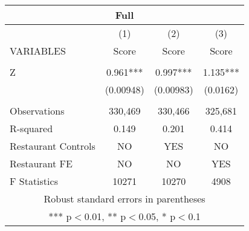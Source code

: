 \begin{tabular}{lccc}
\multicolumn{4}{c}{Full} \\ \hline
 & (1) & (2) & (3) \\
VARIABLES & Score & Score & Score \\ \hline
 &  &  &  \\
Z & 0.961*** & 0.997*** & 1.135*** \\
 & (0.00948) & (0.00983) & (0.0162) \\
 &  &  &  \\
Observations & 330,469 & 330,466 & 325,681 \\
R-squared & 0.149 & 0.201 & 0.414 \\
Restaurant Controls & NO & YES & NO \\
Restaurant FE & NO & NO & YES \\
 F Statistics & 10271 & 10270 & 4908 \\ \hline
\multicolumn{4}{c}{ Robust standard errors in parentheses} \\
\multicolumn{4}{c}{ *** p$<$0.01, ** p$<$0.05, * p$<$0.1} \\
\end{tabular}
